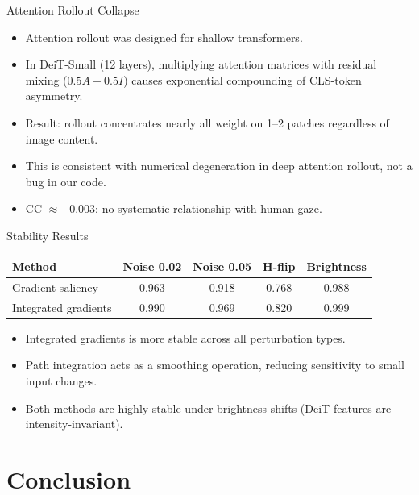 \documentclass{beamer}
\begin{document}
\begin{frame}{Attention Rollout Collapse}
\begin{itemize}
  \item Attention rollout was designed for shallow transformers.
  \item In DeiT-Small (12 layers), multiplying attention matrices with residual mixing ($0.5A + 0.5I$) causes exponential compounding of CLS-token asymmetry.
  \item Result: rollout concentrates nearly all weight on 1--2 patches regardless of image content.
  \item This is consistent with numerical degeneration in deep attention rollout, not a bug in our code.
  \item CC $\approx -0.003$: no systematic relationship with human gaze.
\end{itemize}
\end{frame}

\begin{frame}{Stability Results}
\begin{center}
\begin{tabular}{lcccc}
\toprule
Method & Noise 0.02 & Noise 0.05 & H-flip & Brightness \\
\midrule
Gradient saliency & 0.963 & 0.918 & 0.768 & 0.988 \\
Integrated gradients & 0.990 & 0.969 & 0.820 & 0.999 \\
\bottomrule
\end{tabular}
\end{center}
\vfill
\begin{itemize}
  \item Integrated gradients is more stable across all perturbation types.
  \item Path integration acts as a smoothing operation, reducing sensitivity to small input changes.
  \item Both methods are highly stable under brightness shifts (DeiT features are intensity-invariant).
\end{itemize}
\end{frame}

\section{Conclusion}
\end{document}
